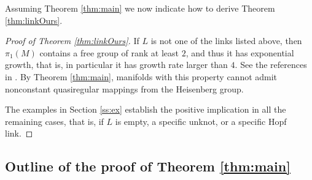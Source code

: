 \documentclass[10pt,letterpaper]{amsart}
\theoremstyle{definition}
\numberwithin{thm}{subsection}
\numberwithin{equation}{section}
\begin{document}
Assuming Theorem \ref{thm:main} we now indicate how to derive Theorem \ref{thm:linkOurs}.

\begin{proof}[Proof of Theorem \ref{thm:linkOurs}]
If $L$ is not one of the links listed above, then $\pi_1(M)$ contains a free group of rank at least $2$, and thus it has exponential growth, that is, in particular it has growth rate larger than $4$. See the references in \cite{MR2832708}. By Theorem  \ref{thm:main}, manifolds with this property cannot admit nonconstant quasiregular mappings from the Heisenberg group.

The examples in Section \ref{ss:ex} establish the positive implication in all the remaining cases, that is, if $L$ is empty, a specific unknot, or a specific Hopf link.
\end{proof}

\subsection{Outline of the proof of Theorem \ref{thm:main}}
\end{document}
